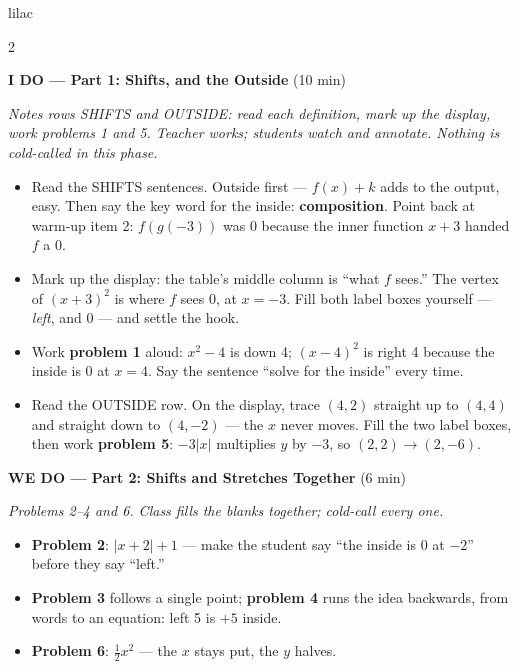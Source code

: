 \documentclass[10pt]{article}
\begin{document}
\begin{skillbox}{lilac}
\begin{multicols}{2}

\textbf{I DO --- Part 1: Shifts, and the Outside} (10 min)

\textit{Notes rows SHIFTS and OUTSIDE: read each definition, mark up the display, work
problems 1 and 5. Teacher works; students watch and annotate. Nothing is cold-called in this
phase.}
\begin{itemize}
  \item Read the SHIFTS sentences. Outside first --- $f(x) + k$ adds to the output, easy. Then
        say the key word for the inside: \textbf{composition}. Point back at warm-up item 2:
        $f(g(-3))$ was 0 because the inner function $x + 3$ handed $f$ a 0.
  \item Mark up the display: the table's middle column is ``what $f$ sees.'' The vertex of
        $(x + 3)^2$ is where $f$ sees 0, at $x = -3$. Fill both label boxes yourself ---
        \emph{left}, and $0$ --- and settle the hook.
  \item Work \textbf{problem 1} aloud: $x^2 - 4$ is down 4; $(x - 4)^2$ is right 4 because the
        inside is 0 at $x = 4$. Say the sentence ``solve for the inside'' every time.
  \item Read the OUTSIDE row. On the display, trace $(4, 2)$ straight up to $(4, 4)$ and
        straight down to $(4, -2)$ --- the $x$ never moves. Fill the two label boxes, then work
        \textbf{problem 5}: $-3|x|$ multiplies $y$ by $-3$, so $(2, 2) \to (2, -6)$.
\end{itemize}

\textbf{WE DO --- Part 2: Shifts and Stretches Together} (6 min)

\textit{Problems 2--4 and 6. Class fills the blanks together; cold-call every one.}
\begin{itemize}
  \item \textbf{Problem 2}: $|x + 2| + 1$ --- make the student say ``the inside is 0 at
        $-2$'' before they say ``left.''
  \item \textbf{Problem 3} follows a single point; \textbf{problem 4} runs the idea backwards,
        from words to an equation: left 5 is $+5$ inside.
  \item \textbf{Problem 6}: $\tfrac{1}{2}x^2$ --- the $x$ stays put, the $y$ halves.
\end{itemize}

\columnbreak


\end{multicols}
\end{skillbox}
\end{document}
